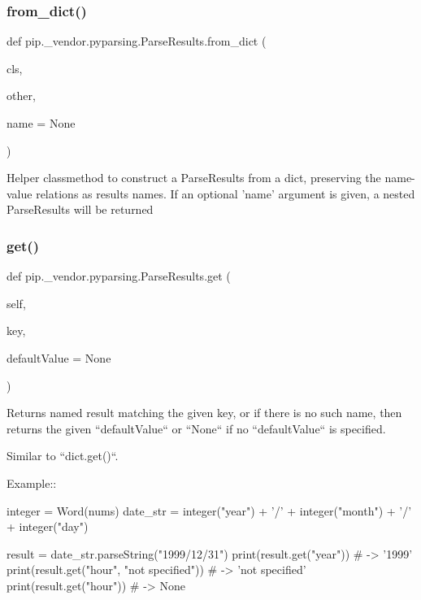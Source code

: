 \subsubsection{\texorpdfstring{from\+\_\+dict()}{from\_dict()}}
{\footnotesize\ttfamily def pip.\+\_\+vendor.\+pyparsing.\+Parse\+Results.\+from\+\_\+dict (\begin{DoxyParamCaption}\item[{}]{cls,  }\item[{}]{other,  }\item[{}]{name = {\ttfamily None} }\end{DoxyParamCaption})}

\begin{DoxyVerb}Helper classmethod to construct a ParseResults from a dict, preserving the
name-value relations as results names. If an optional 'name' argument is
given, a nested ParseResults will be returned
\end{DoxyVerb}
 \mbox{\label{classpip_1_1__vendor_1_1pyparsing_1_1ParseResults_a4b1f1a59eee38d7114c9f5dfe95e6116}} 
\subsubsection{\texorpdfstring{get()}{get()}}
{\footnotesize\ttfamily def pip.\+\_\+vendor.\+pyparsing.\+Parse\+Results.\+get (\begin{DoxyParamCaption}\item[{}]{self,  }\item[{}]{key,  }\item[{}]{default\+Value = {\ttfamily None} }\end{DoxyParamCaption})}

\begin{DoxyVerb}Returns named result matching the given key, or if there is no
such name, then returns the given ``defaultValue`` or ``None`` if no
``defaultValue`` is specified.

Similar to ``dict.get()``.

Example::

    integer = Word(nums)
    date_str = integer("year") + '/' + integer("month") + '/' + integer("day")

    result = date_str.parseString("1999/12/31")
    print(result.get("year")) # -> '1999'
    print(result.get("hour", "not specified")) # -> 'not specified'
    print(result.get("hour")) # -> None
\end{DoxyVerb}
 \mbox{\label{classpip_1_1__vendor_1_1pyparsing_1_1ParseResults_abce243d73b36a544de185f4fd85f23a6}} 

